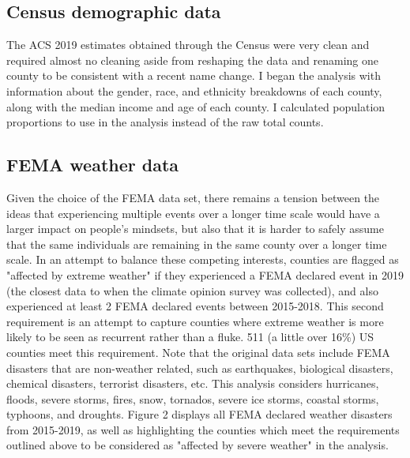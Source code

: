 \documentclass{article}
\begin{document}
\subsection{Census demographic data}
The ACS 2019 estimates obtained through the Census were very clean and
required almost no cleaning aside from reshaping the data and renaming one
county to be consistent with a recent name change. I began the analysis with
information about the gender, race, and ethnicity breakdowns of each county,
along with the median income and age of each county. I calculated population
proportions to use in the analysis instead of the raw total counts.

\subsection{FEMA weather data}
Given the choice of the FEMA data set, there remains a tension between the
ideas that experiencing multiple events over a longer time scale would have
a larger impact on people's mindsets, but also that it is harder to safely
assume that the same individuals are remaining in the same county over a
longer time scale. In an attempt to balance these competing interests,
counties are flagged as "affected by extreme weather" if they experienced
a FEMA declared event in 2019 (the closest data to when the climate opinion
survey was collected), and also experienced at least 2 FEMA declared events
between 2015-2018. This second requirement is an attempt to capture counties
where extreme weather is more likely to be seen as recurrent rather than a
fluke. 511 (a little over 16\%) US counties meet this requirement. Note that
the original data sets include FEMA disasters that are non-weather related,
such as earthquakes, biological disasters, chemical disasters, terrorist
disasters, etc. This analysis considers hurricanes, floods, severe storms,
fires, snow, tornados, severe ice storms, coastal storms, typhoons, and
droughts. Figure 2 displays all FEMA declared weather disasters from 2015-2019,
as well as highlighting the counties which meet the requirements outlined above
to be considered as "affected by severe weather" in the analysis.
\end{document}

